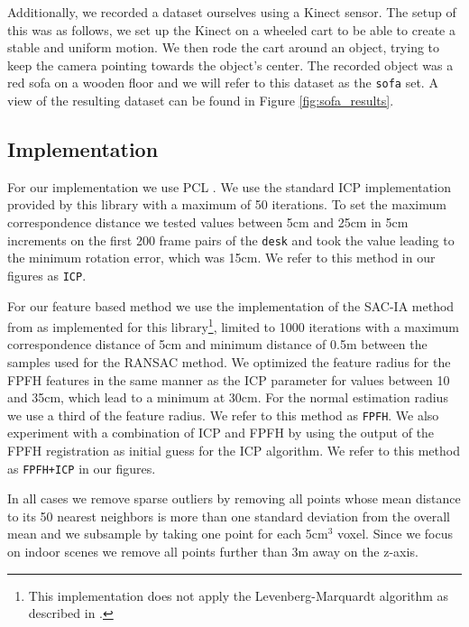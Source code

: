 \documentclass[a4paper]{article}
\begin{document}
Additionally, we recorded a dataset ourselves using a Kinect sensor. The setup of this was as follows, we set up the Kinect on a wheeled cart to be able to create a stable and uniform motion. We then rode the cart around an object, trying to keep the camera pointing towards the object's center. The recorded object was a red sofa on a wooden floor and we will refer to this dataset as the \texttt{sofa} set. A view of the resulting dataset can be found in Figure \ref{fig:sofa_results}.

\subsection{Implementation}

For our implementation we use \ac{PCL} \cite{Rusu_ICRA2011_PCL}. We use the standard \ac{ICP} implementation provided by this library with a maximum of 50 iterations. To set the maximum correspondence distance we tested values between 5cm and 25cm in 5cm increments on the first 200 frame pairs of the \texttt{desk} and took the value leading to the minimum rotation error, which was 15cm. We refer to this method in our figures as \texttt{ICP}.

 For our feature based method we use the implementation of the \ac{SAC-IA} method from \cite{rusu2009fast} as implemented for this library\footnote{This implementation does not apply the Levenberg-Marquardt algorithm as described in \cite{rusu2009fast}.}, limited to 1000 iterations with a maximum correspondence distance of 5cm and minimum distance of 0.5m between the samples used for the \ac{RANSAC} method. We optimized the feature radius  for the \ac{FPFH} features in the same manner as the \ac{ICP} parameter for values between 10 and 35cm, which lead to a minimum at 30cm. For the normal estimation radius we use a third of the feature radius. We refer to this method as \texttt{FPFH}. We also experiment with a combination of \ac{ICP} and \ac{FPFH} by using the output of the \ac{FPFH} registration as initial guess for the \ac{ICP} algorithm. We refer to this method as \texttt{FPFH+ICP} in our figures.
 
In all cases we remove sparse outliers by removing all points whose mean distance to its 50 nearest neighbors is more than one standard deviation from the overall mean and we subsample by taking one point for each 5cm$^3$ voxel. Since we focus on indoor scenes we remove all points  further than 3m away on the z-axis.

\end{document}
